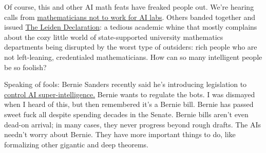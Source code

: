 Of course, this and other AI math feats have freaked people out. We're
hearing calls from
\href{https://tasmin.substack.com/p/more-calls-to-action-for-the-mathematical}{mathematicians
not to work for AI labs}. Others banded together and issued
\href{https://leidendeclaration.ai/}{The Leiden Declaration}: a tedious
academic whine that mostly complains about the cozy little world of
state-supported university mathematics departments being disrupted by
the worst type of outsiders: rich people who are not left-leaning,
credentialed mathematicians. How can so many intelligent people be so
foolish?

Speaking of fools: Bernie Sanders recently said he's introducing
legislation to
\href{https://www.science.org/content/article/bernie-sanders-aims-ban-ai-superintelligence-experts-can-t-agree-what-term-means}{control
AI super-intelligence.} Bernie wants to regulate the bots. I was
dismayed when I heard of this, but then remembered it's a Bernie bill.
Bernie has passed sweet fuck all despite spending decades in the Senate.
Bernie bills aren't even dead-on arrival; in many cases, they never
progress beyond rough drafts. The AIs needn't worry about Bernie. They
have more important things to do, like formalizing other gigantic and
deep theorems.



%
 
